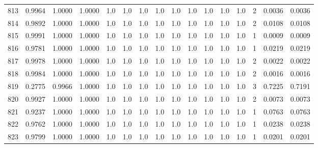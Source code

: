 \begin{tabular}{lrrrrrrrrrrrrrrr}
813 &      0.9964 &  1.0000 &  1.0000 &     1.0 &     1.0 &     1.0 &     1.0 &     1.0 &     1.0 &     1.0 &      1.0 &        1.0 &      2 &                    0.0036 &                     0.0036 \\
814 &      0.9892 &  1.0000 &  1.0000 &     1.0 &     1.0 &     1.0 &     1.0 &     1.0 &     1.0 &     1.0 &      1.0 &        1.0 &      2 &                    0.0108 &                     0.0108 \\
815 &      0.9991 &  1.0000 &  1.0000 &     1.0 &     1.0 &     1.0 &     1.0 &     1.0 &     1.0 &     1.0 &      1.0 &        1.0 &      1 &                    0.0009 &                     0.0009 \\
816 &      0.9781 &  1.0000 &  1.0000 &     1.0 &     1.0 &     1.0 &     1.0 &     1.0 &     1.0 &     1.0 &      1.0 &        1.0 &      1 &                    0.0219 &                     0.0219 \\
817 &      0.9978 &  1.0000 &  1.0000 &     1.0 &     1.0 &     1.0 &     1.0 &     1.0 &     1.0 &     1.0 &      1.0 &        1.0 &      2 &                    0.0022 &                     0.0022 \\
818 &      0.9984 &  1.0000 &  1.0000 &     1.0 &     1.0 &     1.0 &     1.0 &     1.0 &     1.0 &     1.0 &      1.0 &        1.0 &      2 &                    0.0016 &                     0.0016 \\
819 &      0.2775 &  0.9966 &  1.0000 &     1.0 &     1.0 &     1.0 &     1.0 &     1.0 &     1.0 &     1.0 &      1.0 &        1.0 &      3 &                    0.7225 &                     0.7191 \\
820 &      0.9927 &  1.0000 &  1.0000 &     1.0 &     1.0 &     1.0 &     1.0 &     1.0 &     1.0 &     1.0 &      1.0 &        1.0 &      2 &                    0.0073 &                     0.0073 \\
821 &      0.9237 &  1.0000 &  1.0000 &     1.0 &     1.0 &     1.0 &     1.0 &     1.0 &     1.0 &     1.0 &      1.0 &        1.0 &      1 &                    0.0763 &                     0.0763 \\
822 &      0.9762 &  1.0000 &  1.0000 &     1.0 &     1.0 &     1.0 &     1.0 &     1.0 &     1.0 &     1.0 &      1.0 &        1.0 &      1 &                    0.0238 &                     0.0238 \\
823 &      0.9799 &  1.0000 &  1.0000 &     1.0 &     1.0 &     1.0 &     1.0 &     1.0 &     1.0 &     1.0 &      1.0 &        1.0 &      1 &                    0.0201 &                     0.0201 \\

\end{tabular}

